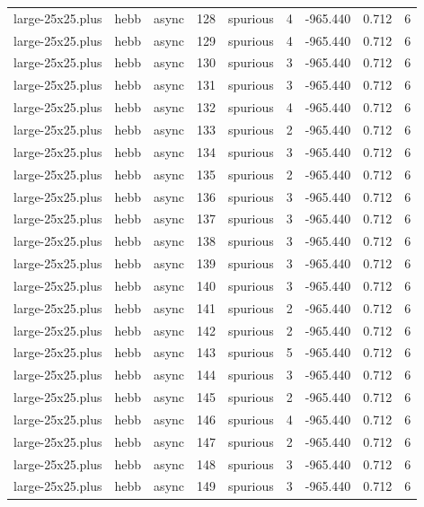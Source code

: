 \begin{tabular}{lllrlrrrr}
large-25x25.plus & hebb & async & 128 & spurious & 4 & -965.440 & 0.712 & 6 \\
large-25x25.plus & hebb & async & 129 & spurious & 4 & -965.440 & 0.712 & 6 \\
large-25x25.plus & hebb & async & 130 & spurious & 3 & -965.440 & 0.712 & 6 \\
large-25x25.plus & hebb & async & 131 & spurious & 3 & -965.440 & 0.712 & 6 \\
large-25x25.plus & hebb & async & 132 & spurious & 4 & -965.440 & 0.712 & 6 \\
large-25x25.plus & hebb & async & 133 & spurious & 2 & -965.440 & 0.712 & 6 \\
large-25x25.plus & hebb & async & 134 & spurious & 3 & -965.440 & 0.712 & 6 \\
large-25x25.plus & hebb & async & 135 & spurious & 2 & -965.440 & 0.712 & 6 \\
large-25x25.plus & hebb & async & 136 & spurious & 3 & -965.440 & 0.712 & 6 \\
large-25x25.plus & hebb & async & 137 & spurious & 3 & -965.440 & 0.712 & 6 \\
large-25x25.plus & hebb & async & 138 & spurious & 3 & -965.440 & 0.712 & 6 \\
large-25x25.plus & hebb & async & 139 & spurious & 3 & -965.440 & 0.712 & 6 \\
large-25x25.plus & hebb & async & 140 & spurious & 3 & -965.440 & 0.712 & 6 \\
large-25x25.plus & hebb & async & 141 & spurious & 2 & -965.440 & 0.712 & 6 \\
large-25x25.plus & hebb & async & 142 & spurious & 2 & -965.440 & 0.712 & 6 \\
large-25x25.plus & hebb & async & 143 & spurious & 5 & -965.440 & 0.712 & 6 \\
large-25x25.plus & hebb & async & 144 & spurious & 3 & -965.440 & 0.712 & 6 \\
large-25x25.plus & hebb & async & 145 & spurious & 2 & -965.440 & 0.712 & 6 \\
large-25x25.plus & hebb & async & 146 & spurious & 4 & -965.440 & 0.712 & 6 \\
large-25x25.plus & hebb & async & 147 & spurious & 2 & -965.440 & 0.712 & 6 \\
large-25x25.plus & hebb & async & 148 & spurious & 3 & -965.440 & 0.712 & 6 \\
large-25x25.plus & hebb & async & 149 & spurious & 3 & -965.440 & 0.712 & 6 \\

\end{tabular}
